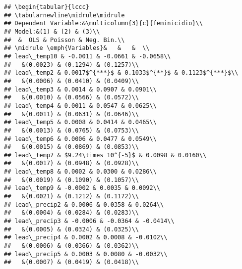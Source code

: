 \documentclass[
]{article}
\begin{document}
\begin{verbatim}
## \begin{tabular}{lccc}
## \tabularnewline\midrule\midrule
## Dependent Variable:&\multicolumn{3}{c}{feminicidio}\\
## Model:&(1) & (2) & (3)\\
##  &  OLS & Poisson & Neg. Bin.\\
## \midrule \emph{Variables}&   &   &  \\
## lead\_temp10 & -0.0011 & -0.0661 & -0.0658\\
##   &(0.0023) & (0.1294) & (0.1257)\\
## lead\_temp2 & 0.0017$^{***}$ & 0.1033$^{**}$ & 0.1123$^{***}$\\
##   &(0.0006) & (0.0410) & (0.0409)\\
## lead\_temp3 & 0.0014 & 0.0907 & 0.0901\\
##   &(0.0010) & (0.0566) & (0.0572)\\
## lead\_temp4 & 0.0011 & 0.0547 & 0.0625\\
##   &(0.0011) & (0.0631) & (0.0646)\\
## lead\_temp5 & 0.0008 & 0.0414 & 0.0465\\
##   &(0.0013) & (0.0765) & (0.0753)\\
## lead\_temp6 & 0.0006 & 0.0477 & 0.0549\\
##   &(0.0015) & (0.0869) & (0.0853)\\
## lead\_temp7 & $9.24\times 10^{-5}$ & 0.0098 & 0.0160\\
##   &(0.0017) & (0.0948) & (0.0928)\\
## lead\_temp8 & 0.0002 & 0.0300 & 0.0286\\
##   &(0.0019) & (0.1090) & (0.1057)\\
## lead\_temp9 & -0.0002 & 0.0035 & 0.0092\\
##   &(0.0021) & (0.1212) & (0.1172)\\
## lead\_precip2 & 0.0006 & 0.0358 & 0.0264\\
##   &(0.0004) & (0.0284) & (0.0283)\\
## lead\_precip3 & -0.0006 & -0.0364 & -0.0414\\
##   &(0.0005) & (0.0324) & (0.0325)\\
## lead\_precip4 & 0.0002 & 0.0008 & -0.0102\\
##   &(0.0006) & (0.0366) & (0.0362)\\
## lead\_precip5 & 0.0003 & 0.0080 & -0.0032\\
##   &(0.0007) & (0.0419) & (0.0418)\\

\end{verbatim}
\end{document}
